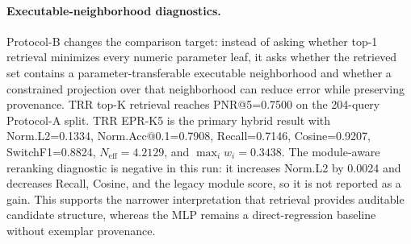 \paragraph{Executable-neighborhood diagnostics.}
Protocol-B changes the comparison target: instead of asking whether top-1 retrieval minimizes every numeric parameter leaf, it asks whether the retrieved set contains a parameter-transferable executable neighborhood and whether a constrained projection over that neighborhood can reduce error while preserving provenance. TRR top-K retrieval reaches PNR@5=0.7500 on the 204-query Protocol-A split. TRR EPR-K5 is the primary hybrid result with Norm.L2=0.1334, Norm.Acc@0.1=0.7908, Recall=0.7146, Cosine=0.9207, SwitchF1=0.8824, $N_{\mathrm{eff}}=4.2129$, and $\max_i w_i=0.3438$. The module-aware reranking diagnostic is negative in this run: it increases Norm.L2 by 0.0024 and decreases Recall, Cosine, and the legacy module score, so it is not reported as a gain. This supports the narrower interpretation that retrieval provides auditable candidate structure, whereas the MLP remains a direct-regression baseline without exemplar provenance.

\begin{table}[t]
\centering
\caption{TRR EPR sensitivity. K=5, $\tau=0.05$, softmax weighting is the primary row; larger neighborhoods can slightly reduce distance but diffuse exemplar locality. Lower Norm.L2 is better; higher Recall, Cos, and SwitchF1 are better.}
\label{tab:epr_sensitivity}
\small
\setlength{\tabcolsep}{4pt}
\end{table}

